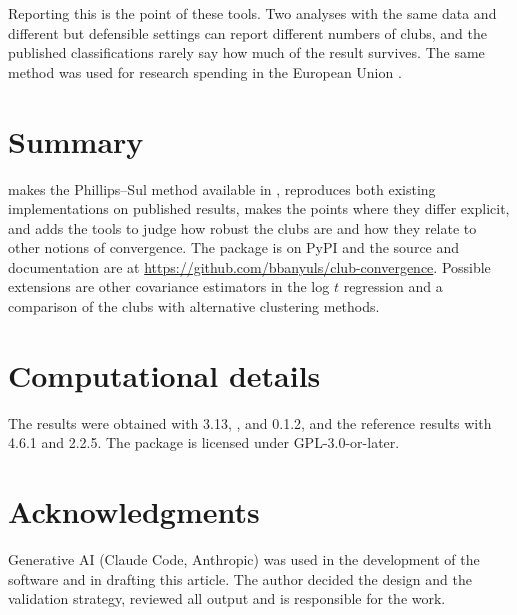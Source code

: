 \documentclass[article]{jss}
\begin{document}
Reporting this is the point of these tools. Two analyses with the same data and
different but defensible settings can report different numbers of clubs, and the
published classifications rarely say how much of the result survives. The same method
was used for research spending in the European Union \citep{BanyulsVides2025}.

\section{Summary} \label{sec:summary}

 makes the Phillips--Sul method available in ,
reproduces both existing implementations on published results, makes the points where they
differ explicit, and adds the tools to judge how robust the clubs are and how they relate to
other notions of convergence. The package is on PyPI and the source and documentation are
at \url{https://github.com/bbanyuls/club-convergence}. Possible extensions are other
covariance estimators in the log $t$ regression and a comparison of the clubs with
alternative clustering methods.

\section*{Computational details}

The results were obtained with  3.13, ,  and
 0.1.2, and the reference results with  4.6.1 and
 2.2.5. The package is licensed under GPL-3.0-or-later.

\section*{Acknowledgments}

Generative AI (Claude Code, Anthropic) was used in the development of the software and in
drafting this article. The author decided the design and the validation strategy,
reviewed all output and is responsible for the work.


\end{document}
